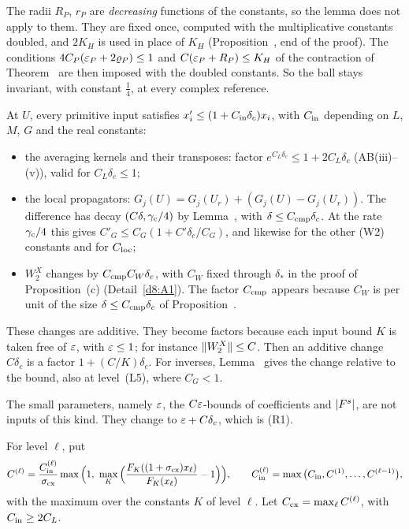 \begin{detail}
\begin{step}
The radii $R_P$, $r_P$ are \emph{decreasing} functions of the constants, so the lemma does not apply to them. They are fixed once, computed with the multiplicative constants doubled, and $2K_H$ is used in place of $K_H$ (Proposition~, end of the proof). The conditions $4C_P(\varepsilon_P+2\varrho_P)\le1$ and $C(\varepsilon_P+R_P)\le K_H$ of the contraction of Theorem~ are then imposed with the doubled constants. So the ball stays invariant, with constant $\frac14$, at every complex reference.
\end{step}

\begin{step}
At $U$, every primitive input satisfies $x'_i\le(1+C_{\rm in}\delta_c)x_i$, with $C_{\rm in}$ depending on $L$, $M$, $G$ and the real constants:
\begin{itemize}
\item the averaging kernels and their transposes: factor $e^{C_L\delta_c}\le1+2C_L\delta_c$ (AB(iii)--(v)), valid for $C_L\delta_c\le1$;
\item the local propagators: $G_j(U)=G_j(U_r)+(G_j(U)-G_j(U_r))$. The difference has decay $(C\delta,\gamma_{\rm c}/4)$ by Lemma~, with $\delta\le C_{\rm cmp}\delta_c$. At the rate $\gamma_{\rm c}/4$ this gives $C'_G\le C_G(1+C'\delta_c/C_G)$, and likewise for the other (W2) constants and for $C_{\rm loc}$;
\item $W_2^X$ changes by $C_{\rm cmp}C_W\delta_c$, with $C_W$ fixed through $\delta_*$ in the proof of Proposition~(c) (Detail~\ref{d8:A1}). The factor $C_{\rm cmp}$ appears because $C_W$ is per unit of the size $\delta\le C_{\rm cmp}\delta_c$ of Proposition~.
\end{itemize}
These changes are additive. They become factors because each input bound $K$ is taken free of $\varepsilon$, with $\varepsilon\le1$; for instance $\lVert W_2^X\rVert\le C$. Then an additive change $C\delta_c$ is a factor $1+(C/K)\delta_c$. For inverses, Lemma~ gives the change relative to the bound, also at level~(L5), where $C_G<1$.

The small parameters, namely $\varepsilon$, the $C\varepsilon$-bounds of coefficients and $\lvert F^s\rvert$, are not inputs of this kind. They change to $\varepsilon+C\delta_c$, which is (R1).
\end{step}

\begin{step}
For level $\ell$, put
\[
C^{(\ell)}=\frac{C^{(\ell)}_{\rm in}}{\sigma_{\rm cx}}\max\Big(1,\ \max_K\Big(\frac{F_K((1+\sigma_{\rm cx})x_\ell)}{F_K(x_\ell)}-1\Big)\Big),\qquad C^{(\ell)}_{\rm in}=\max\big(C_{\rm in},C^{(1)},\dots,C^{(\ell-1)}\big),
\]
with the maximum over the constants $K$ of level $\ell$. Let $C_{\rm cx}=\max_\ell C^{(\ell)}$, with $C_{\rm in}\ge2C_L$.


\end{step}
\end{detail}
